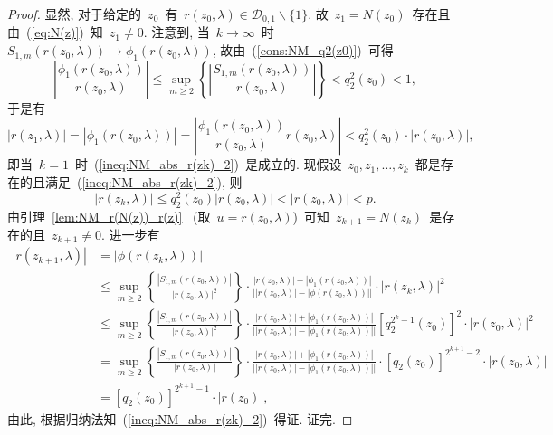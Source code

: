 \begin{proof}
显然, 对于给定的~$z_0$~有~$r(z_0,\lambda) \in \mathcal
{D}_{0,1}\backslash\{1\}$. 故~$z_1 =
N(z_0)$~存在且由~(\ref{eq:N(z)})~知~$z_1 \neq 0$. 注意到,
当~$k\to\infty$~时~$S_{1,m}(r(z_0,\lambda)) \to
\phi_1(r(z_0,\lambda))$, 故由~(\ref{cons:NM_q2(z0)})~可得
$$
\left|\frac{\phi_1(r(z_0,\lambda))}{r(z_0,\lambda)}\right| \leq
\sup_{m\geq2}
\left\{\left|\frac{S_{1,m}(r(z_0,\lambda))}{r(z_0,\lambda)}\right|\right\}
< q_2^2(z_0)<1,
$$
于是有
$$
|r(z_1,\lambda)| = |\phi_1(r(z_0,\lambda))| =
\left|\frac{\phi_1(r(z_0,\lambda))}{r(z_0,\lambda)}r(z_0,\lambda)\right|
< q_2^2(z_0)\cdot|r(z_0,\lambda)|,
$$
即当~$k=1$~时~(\ref{ineq:NM_abs_r(zk)_2})~是成立的. 现假设~$z_0,
z_1, \ldots, z_k$~都是存在的且满足~(\ref{ineq:NM_abs_r(zk)_2}), 则
$$
|r(z_k,\lambda)| \leq q_2^2(z_0)|r(z_0,\lambda)|< |r(z_0,\lambda)| <
p.
$$
由引理~\ref{lem:NM_r(N(z))_r(z)}~ (取~$u =
r(z_0,\lambda)$)~可知~$z_{k+1} = N(z_k)$~是存在的且~$z_{k+1} \neq
0$. 进一步有
\begin{align*}
|r(z_{k+1},\lambda)| & = |\phi(r(z_k,\lambda))| \\
& \leq \sup_{m \geq 2}
\left\{\frac{|S_{1,m}(r(z_0,\lambda))|}{|r(z_0,\lambda)|^2}\right\}\cdot
\frac{|r(z_0,\lambda)|
+|\phi_1(r(z_0,\lambda))|}{\Big||r(z_0,\lambda)| -
|\phi(r(z_0,\lambda))|\Big|} \cdot |r(z_k,\lambda)|^2 \\
& \leq \sup_{m \geq 2}
\left\{\frac{|S_{1,m}(r(z_0,\lambda))|}{|r(z_0,\lambda)|^2}\right\}\cdot
\frac{|r(z_0,\lambda)|
+|\phi_1(r(z_0,\lambda))|}{\Big||r(z_0,\lambda)| -
|\phi_1(r(z_0,\lambda))|\Big|}
\left[q_2^{2^k-1}(z_0)\right]^2\cdot|r(z_0,\lambda)|^2 \\
& = \sup_{m \geq 2}
\left\{\frac{|S_{1,m}(r(z_0,\lambda))|}{|r(z_0,\lambda)|}\right\}\cdot
\frac{|r(z_0,\lambda)|
+|\phi_1(r(z_0,\lambda))|}{\Big||r(z_0,\lambda)| -
|\phi_1(r(z_0,\lambda))|\Big|} \cdot [q_2(z_0)]^{2^{k+1}-2} \cdot
|r(z_0,\lambda)| \\
& = [q_2(z_0)]^{2^{k+1}-1} \cdot |r(z_0)|,
\end{align*}
由此, 根据归纳法知~(\ref{ineq:NM_abs_r(zk)_2})~得证. 证完.
\end{proof}



